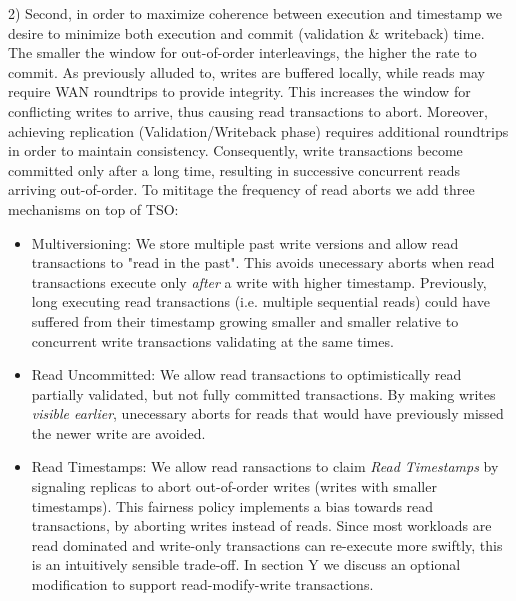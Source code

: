 2) Second, in order to maximize coherence between execution and timestamp we desire to minimize both execution and commit (validation \& writeback) time. The smaller the window for out-of-order interleavings, the higher the rate to commit. As previously alluded to, writes are buffered locally, while reads may require WAN roundtrips to provide integrity. This increases the window for conflicting writes to arrive, thus causing read transactions to abort.
Moreover, achieving replication (Validation/Writeback phase) requires additional roundtrips in order to maintain consistency. Consequently, write transactions become committed only after a long time, resulting in successive concurrent reads arriving out-of-order.
To mititage the frequency of read aborts we add three mechanisms on top of TSO:
\begin{itemize}
\item Multiversioning: We store multiple past write versions and allow read transactions to "read in the past". This avoids unecessary aborts when read transactions execute only \textit{after} a write with higher timestamp. Previously, long executing read transactions (i.e. multiple sequential reads) could have suffered from their timestamp growing smaller and smaller relative to concurrent write transactions validating at the same times.
\item Read Uncommitted: We allow read transactions to optimistically read partially validated, but not fully committed transactions. By making writes \textit{visible earlier}, unecessary aborts for reads that would have previously missed the newer write are avoided.
\item Read Timestamps: We allow read ransactions to claim \textit{Read Timestamps} by signaling replicas to abort out-of-order writes (writes with smaller timestamps). This fairness policy implements a bias towards read transactions, by aborting writes instead of reads. Since most workloads are read dominated and write-only transactions can re-execute more swiftly, this is an intuitively sensible trade-off. In section Y we discuss an optional modification to support read-modify-write transactions. 
\end{itemize}


